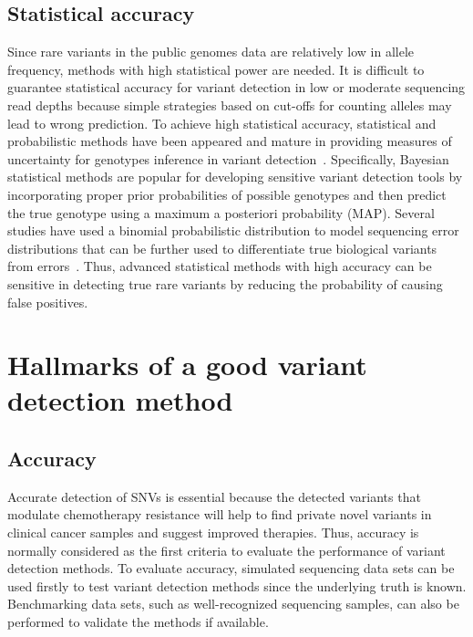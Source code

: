 \documentclass[a4,center,fleqn]{NAR}
\begin{document}
\subsection{Statistical accuracy}

Since rare variants in the public genomes data are relatively low in allele frequency, methods with high statistical power are needed.
It is difficult to guarantee statistical accuracy for variant detection in low or moderate sequencing read depths because simple strategies based on cut-offs for counting alleles may lead to wrong prediction.
To achieve high statistical accuracy, statistical and probabilistic methods have been appeared and mature in providing measures of uncertainty for genotypes inference in variant detection~\citep{Nielsen2011}.  
Specifically, Bayesian statistical methods are popular for developing sensitive variant detection tools by incorporating proper prior probabilities of possible genotypes and then predict the true genotype using a maximum a posteriori probability (MAP).
Several studies have used a binomial probabilistic distribution to model sequencing error distributions that can be further used to differentiate true biological variants from errors~\citep{Flaherty2012, Shiraishi2013, gerstung2012reliable, Christoforides2013}.
Thus, advanced statistical methods with high accuracy can be sensitive in detecting true rare variants by reducing the probability of causing false positives.

\section{Hallmarks of a good variant detection method}

\subsection{Accuracy}
Accurate detection of SNVs is essential because the detected variants that modulate chemotherapy resistance will help to find private novel variants in clinical cancer samples and suggest improved therapies.
Thus, accuracy is normally considered as the first criteria to evaluate the performance of variant detection methods.
To evaluate accuracy, simulated sequencing data sets can be used firstly to test variant detection methods since the underlying truth is known.
Benchmarking data sets, such as well-recognized sequencing samples, can also be performed to validate the methods if available.
\end{document}
